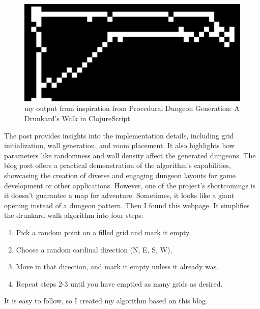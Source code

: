 \documentclass[10pt,twocolumn]{article}
\begin{document}
\begin{figure}
    \centering
    \includegraphics[width=0.5\linewidth]{mine.png}
    \caption{my output from inspiration from Procedural Dungeon Generation: A Drunkard's Walk in ClojureScript}
    \label{fig:enter-label}
\end{figure}


The post provides insights into the implementation details, including grid initialization, wall generation, and room placement. It also highlights how parameters like randomness and wall density affect the generated dungeons. The blog post offers a practical demonstration of the algorithm's capabilities, showcasing the creation of diverse and engaging dungeon layouts for game development or other applications. However, one of the project's shortcomings is it doesn't guarantee a map for adventure. Sometimes, it looks like a giant opening instead of a dungeon pattern.
Then I found this webpage. It simplifies the drunkard walk algorithm into four steps:
\begin{enumerate}
    \item Pick a random point on a filled grid and mark it empty.
    \item Choose a random cardinal direction (N, E, S, W).
    \item Move in that direction, and mark it empty unless it already was.
    \item Repeat steps 2-3 until you have emptied as many grids as desired.\cite{pcgwiki_drunkardwalk}
\end{enumerate}

It is easy to follow, so I created my algorithm based on this blog.
\end{document}
